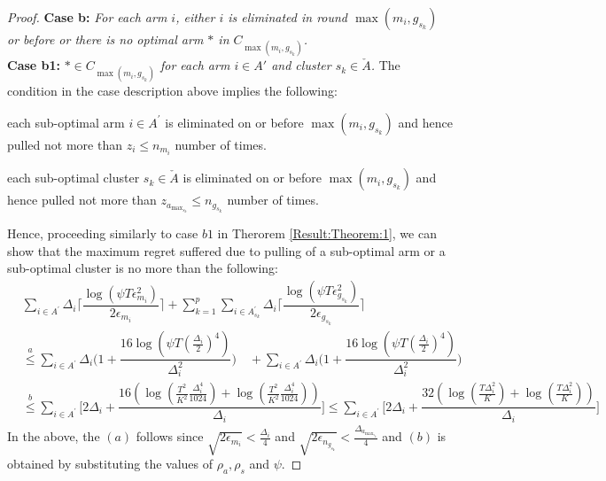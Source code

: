 \begin{proof}
\textbf{Case b:} \textit{For each arm $i$, either ${i}$ is eliminated in round $\max (m_{i},g_{s_{k}})$ or before or there is no optimal arm ${*}$ in $C_{\max(m_{i},g_{s_{k}})}$.} \\
\textbf{Case b1:} \textit{${*}\in C_{\max(m_{i},g_{s_{k}})}$ for each arm $i \in A'$ and cluster $s_k \in \check A$.} 
The condition in the case description above implies the following: \\
\begin{inparaenum}[\bfseries (i)]
\item each sub-optimal arm ${i}\in A^{'}$ is  eliminated on or before $\max (m_{i},g_{s_{k}})$ and hence  pulled not more than $z_i \leq n_{m_{i}}$ number of times.\\
\item each sub-optimal cluster $s_k \in \check A$ is  eliminated on or before $\max (m_{i},g_{s_{k}})$ and hence  pulled not more than $ z_{a_{\max_{s_{k}}}} \leq n_{g_{s_{k}}}$ number of times.
\end{inparaenum}

Hence, proceeding similarly to case $b1$ in Therorem \ref{Result:Theorem:1}, we can show that the maximum regret suffered due to pulling of a sub-optimal arm or a sub-optimal cluster is no more than the following:
 \begin{align*}
 &\sum_{i\in A^{'}}\Delta_{i}\bigg\lceil\dfrac{\log{(\psi T\epsilon_{m_{i}}^{2})}}{2\epsilon_{m_{i}}}\bigg\rceil 
\!+\! \sum_{k=1}^{p}\sum_{i\in A_{s_{k}}^{'}}\Delta_{i}\bigg\lceil\dfrac{\log{(\psi T\epsilon_{g_{s_{k}}}^{2})}}{2\epsilon_{g_{s_{k}}}}\bigg\rceil \\
&\overset{a}{\leq}\sum_{i\in A^{'}}\Delta_{i}\bigg(1+\dfrac{16\log{\left(\psi T\left(\frac{\Delta_{i}}{2}\right)^{4}\right)}}{\Delta_{i}^{2}}\bigg) 
\quad+ \sum_{i\in A^{'}}\Delta_{i}\bigg(1+\dfrac{16\log{\left(\psi T\left(\frac{\Delta_{i}}{2}\right)^{4}\right)}}{\Delta_{i}^{2}}\bigg)
\\
 &\overset{b}{\leq} \sum_{i\in A^{'}}\!\bigg[ 2\Delta_{i}+\dfrac{16(\log{(\frac{T^2}{K^2}\frac{\Delta_{i}^{4}}{1024})} + \log{(\frac{T^2}{K^2}\frac{\Delta_{i}^{4}}{1024})})}{\Delta_{i}} \bigg] \leq \sum_{i\in A^{'}}\!\bigg[ 2\Delta_{i}+\dfrac{32\left(\log{(\frac{T\Delta_{i}^2}{K})} + \log{(\frac{T\Delta_{i}^2}{K})}\right)}{\Delta_{i}} \bigg]
 \end{align*}
In the above, the $(a)$ follows since $\sqrt{2\epsilon_{m_{i}}} < \frac{\Delta_{i}}{4}$ and $\sqrt{2\epsilon_{n_{g_{s_{k}}}}} < \frac{\Delta_{a_{\max_{s_{k}}}}}{4}$ and $(b)$ is obtained by substituting the values of $\rho_a,\rho_s$ and $\psi$.


\end{proof}
